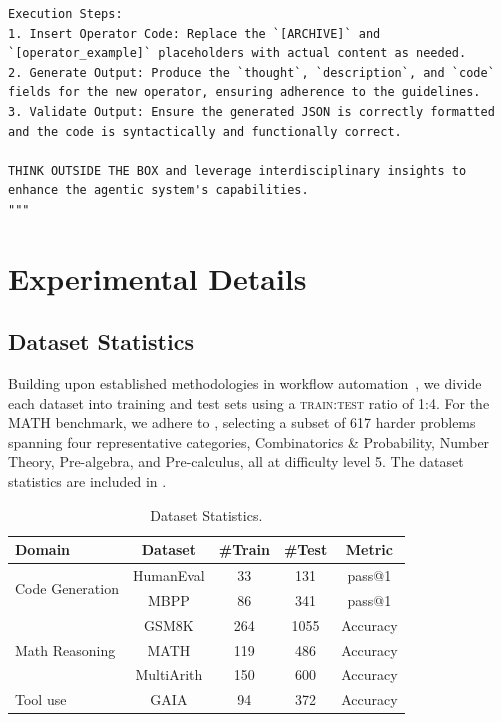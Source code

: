 \documentclass{article}
\theoremstyle{plain}
\theoremstyle{definition}
\theoremstyle{remark}
\begin{document}
\begin{tcolorbox}
{\begin{lstlisting}
Execution Steps:
1. Insert Operator Code: Replace the `[ARCHIVE]` and `[operator_example]` placeholders with actual content as needed.
2. Generate Output: Produce the `thought`, `description`, and `code` fields for the new operator, ensuring adherence to the guidelines.
3. Validate Output: Ensure the generated JSON is correctly formatted and the code is syntactically and functionally correct.

THINK OUTSIDE THE BOX and leverage interdisciplinary insights to enhance the agentic system's capabilities.
"""
\end{lstlisting}
}
\end{tcolorbox}



\section{Experimental Details}
\subsection{Dataset Statistics}\label{app:dataset}

Building upon established methodologies in workflow automation~\cite{saad2024archon,hu2024adas,zhang2024aflow}, we divide each dataset into training and test sets using a \textsc{train:test} ratio of 1:4. For the MATH benchmark, we adhere to \cite{hong2024datainterpreter}, selecting a subset of 617 harder problems spanning four representative categories, Combinatorics \& Probability, Number Theory, Pre-algebra, and Pre-calculus, all at difficulty level 5. The dataset statistics are included in .

\begin{table}[!h]
\vspace{-1em}
\caption{Dataset Statistics.}\label{tab:dataset}
\vspace{0.1em}
\centering
\begin{tabular}{l|cccc}
\toprule
Domain & Dataset & \#Train & \#Test & Metric  \\ 
\midrule
\multirow{2}{*}{Code Generation} & HumanEval & 33 & 131 & pass@1\\ 
& MBPP & 86 & 341 & pass@1\\ 
\midrule
\multirow{3}{*}{Math Reasoning}& GSM8K & 264 & 1055 & Accuracy\\ 
& MATH & 119 & 486 & Accuracy\\ 
& MultiArith &150 & 600 & Accuracy\\
\midrule
Tool use & GAIA & 94 & 372 & Accuracy\\
\bottomrule
\end{tabular}
\end{table}
\end{document}
